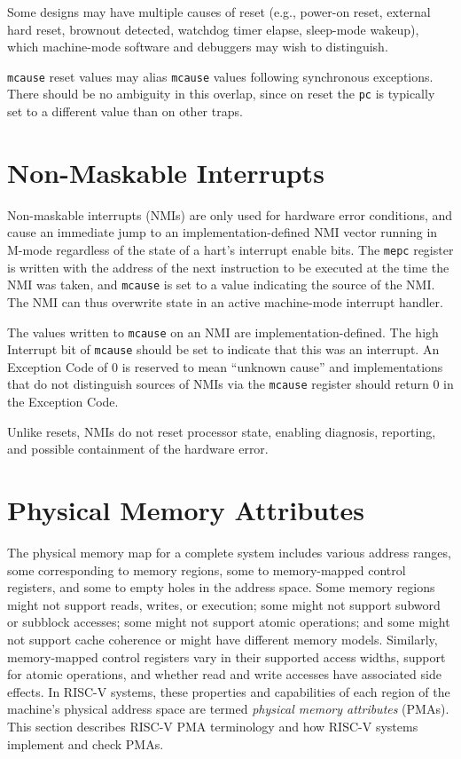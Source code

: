 \begin{commentary}
Some designs may have multiple causes of reset (e.g., power-on reset,
external hard reset, brownout detected, watchdog timer elapse,
sleep-mode wakeup), which machine-mode software and debuggers may wish
to distinguish.

{\tt mcause} reset values may alias {\tt mcause} values following synchronous
exceptions.  There should be no ambiguity in this overlap, since on reset the
{\tt pc} is typically set to a different value than on other traps.
\end{commentary}

\section{Non-Maskable Interrupts}
\label{sec:nmi}

Non-maskable interrupts (NMIs) are only used for hardware error
conditions, and cause an immediate jump to an implementation-defined
NMI vector running in M-mode regardless of the state of a hart's
interrupt enable bits.  The {\tt mepc} register is written with the
address of the next instruction to be executed at the time the NMI was
taken, and {\tt mcause} is set to a value indicating the source of the
NMI.  The NMI can thus overwrite state in an active machine-mode
interrupt handler.

The values written to {\tt mcause} on an NMI are
implementation-defined.  The high Interrupt bit of {\tt mcause} should
be set to indicate that this was an interrupt.  An Exception Code of 0
is reserved to mean ``unknown cause'' and implementations that do not
distinguish sources of NMIs via the {\tt mcause} register should
return 0 in the Exception Code.

Unlike resets, NMIs do not reset processor state, enabling diagnosis,
reporting, and possible containment of the hardware error.

\section{Physical Memory Attributes}
\label{sec:pma}

The physical memory map for a complete system includes various address
ranges, some corresponding to memory regions, some to memory-mapped
control registers, and some to empty holes in the address space.  Some
memory regions might not support reads, writes, or execution; some
might not support subword or subblock accesses; some might not support
atomic operations; and some might not support cache coherence or might
have different memory models.  Similarly, memory-mapped control
registers vary in their supported access widths, support for atomic
operations, and whether read and write accesses have associated side
effects.  In RISC-V systems, these properties and capabilities of each
region of the machine's physical address space are termed {\em
  physical memory attributes} (PMAs).  This section describes RISC-V
PMA terminology and how RISC-V systems implement and check PMAs.

